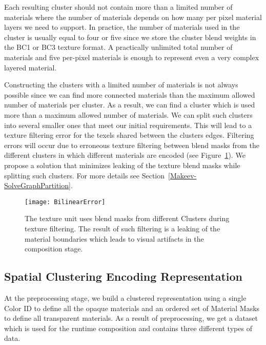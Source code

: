 Each resulting cluster should not contain more than a limited number of materials where the number of materials depends on how many per pixel material layers we need to support.
In practice, the number of materials used in the cluster is usually equal to four or five since we store the cluster blend weights in the BC1 or BC3 texture format.
A practically unlimited total number of materials and five per-pixel materials is enough to represent even a very complex layered material.

Constructing the clusters with a limited number of materials is not always possible since we can find more connected materials than the maximum allowed number of materials per cluster.
As a result, we can find a cluster which is used more than a maximum allowed number of materials.
We can split such clusters into several smaller ones that meet our initial requirements.
This will lead to a texture filtering error for the texels shared between the clusters edges.
Filtering errors will occur due to erroneous texture filtering between blend masks from the different clusters in which different materials are encoded (see Figure~\ref{Makeev-MaskFilteringError}).
We propose a solution that minimizes leaking of the texture blend masks while splitting such clusters.
For more details see Section~\ref{Makeev-SolveGraphPartition}.

\begin{figure}\centering
\texttt{[image: BilinearError]}
\caption{
The texture unit uses blend masks from different Clusters during texture filtering.
The result of such filtering is a leaking of the material boundaries which leads to visual artifacts in the composition stage.
}
\label{Makeev-MaskFilteringError}
\end{figure}

\subsection{Spatial Clustering Encoding Representation}

At the preprocessing stage, we build a clustered representation using a single Color ID to define all the opaque materials and an ordered set of Material Masks to define all transparent materials.
As a result of preprocessing, we get a dataset which is used for the runtime composition and contains three different types of data.

